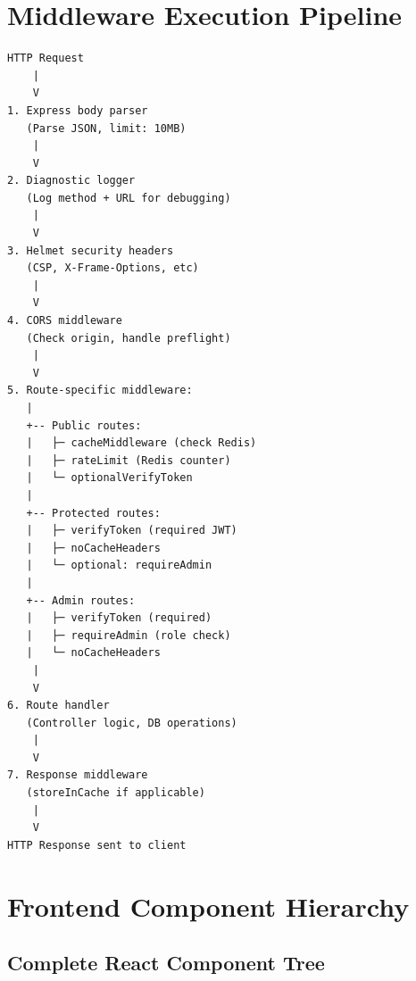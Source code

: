 \documentclass[12pt,a4paper]{report}
\begin{document}
\section{Middleware Execution Pipeline}

\begin{lstlisting}[language=text, caption=Complete Middleware Chain]
HTTP Request
    |
    V
1. Express body parser
   (Parse JSON, limit: 10MB)
    |
    V
2. Diagnostic logger
   (Log method + URL for debugging)
    |
    V
3. Helmet security headers
   (CSP, X-Frame-Options, etc)
    |
    V
4. CORS middleware
   (Check origin, handle preflight)
    |
    V
5. Route-specific middleware:
   |
   +-- Public routes:
   |   ├─ cacheMiddleware (check Redis)
   |   ├─ rateLimit (Redis counter)
   |   └─ optionalVerifyToken
   |
   +-- Protected routes:
   |   ├─ verifyToken (required JWT)
   |   ├─ noCacheHeaders
   |   └─ optional: requireAdmin
   |
   +-- Admin routes:
   |   ├─ verifyToken (required)
   |   ├─ requireAdmin (role check)
   |   └─ noCacheHeaders
    |
    V
6. Route handler
   (Controller logic, DB operations)
    |
    V
7. Response middleware
   (storeInCache if applicable)
    |
    V
HTTP Response sent to client
\end{lstlisting}

\section{Frontend Component Hierarchy}

\subsection{Complete React Component Tree}
\end{document}
